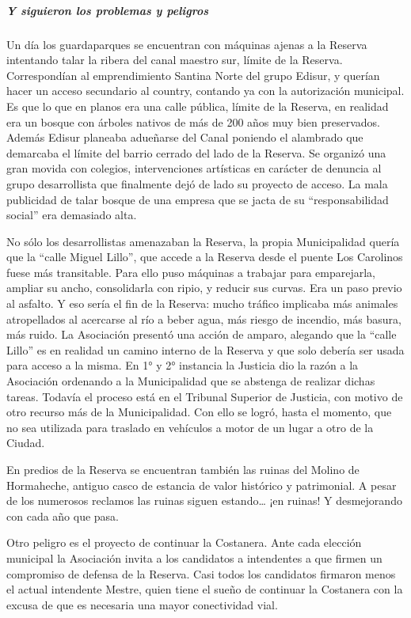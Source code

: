 \documentclass[
]{article}
\begin{document}
\hypertarget{y-siguieron-los-problemas-y-peligros}{%
\subparagraph{Y siguieron los problemas y
peligros}\label{y-siguieron-los-problemas-y-peligros}}

Un día los guardaparques se encuentran con máquinas ajenas a la Reserva
intentando talar la ribera del canal maestro sur, límite de la Reserva.
Correspondían al emprendimiento Santina Norte del grupo Edisur, y
querían hacer un acceso secundario al country, contando ya con la
autorización municipal. Es que lo que en planos era una calle pública,
límite de la Reserva, en realidad era un bosque con árboles nativos de
más de 200 años muy bien preservados. Además Edisur planeaba adueñarse
del Canal poniendo el alambrado que demarcaba el límite del barrio
cerrado del lado de la Reserva. Se organizó una gran movida con
colegios, intervenciones artísticas en carácter de denuncia al grupo
desarrollista que finalmente dejó de lado su proyecto de acceso. La mala
publicidad de talar bosque de una empresa que se jacta de su
``responsabilidad social'' era demasiado alta.

No sólo los desarrollistas amenazaban la Reserva, la propia
Municipalidad quería que la ``calle Miguel Lillo'', que accede a la
Reserva desde el puente Los Carolinos fuese más transitable. Para ello
puso máquinas a trabajar para emparejarla, ampliar su ancho,
consolidarla con ripio, y reducir sus curvas. Era un paso previo al
asfalto. Y eso sería el fin de la Reserva: mucho tráfico implicaba más
animales atropellados al acercarse al río a beber agua, más riesgo de
incendio, más basura, más ruido. La Asociación presentó una acción de
amparo, alegando que la ``calle Lillo'' es en realidad un camino interno
de la Reserva y que solo debería ser usada para acceso a la misma. En 1°
y 2° instancia la Justicia dio la razón a la Asociación ordenando a la
Municipalidad que se abstenga de realizar dichas tareas. Todavía el
proceso está en el Tribunal Superior de Justicia, con motivo de otro
recurso más de la Municipalidad. Con ello se logró, hasta el momento,
que no sea utilizada para traslado en vehículos a motor de un lugar a
otro de la Ciudad.

En predios de la Reserva se encuentran también las ruinas del Molino de
Hormaheche, antiguo casco de estancia de valor histórico y patrimonial.
A pesar de los numerosos reclamos las ruinas siguen estando\ldots{} ¡en
ruinas! Y desmejorando con cada año que pasa.

Otro peligro es el proyecto de continuar la Costanera. Ante cada
elección municipal la Asociación invita a los candidatos a intendentes a
que firmen un compromiso de defensa de la Reserva. Casi todos los
candidatos firmaron menos el actual intendente Mestre, quien tiene el
sueño de continuar la Costanera con la excusa de que es necesaria una
mayor conectividad vial.
\end{document}
